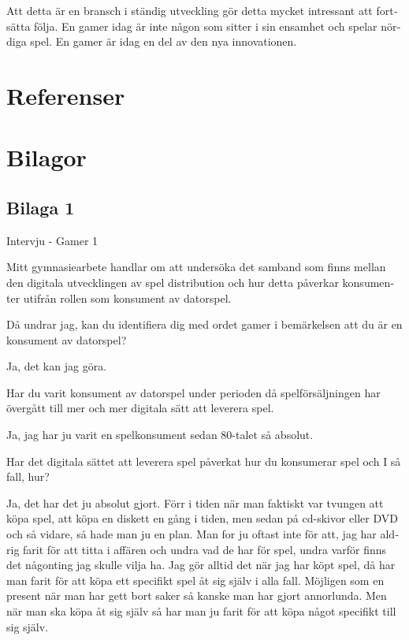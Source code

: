 \documentclass[11p]{article}
\begin{document}
\begin{otherlanguage}{swedish}
        Att detta är en bransch i ständig utveckling gör detta mycket intressant att fortsätta följa. En gamer idag är inte någon som sitter i sin ensamhet och spelar nördiga spel. En gamer är idag en del av den nya innovationen.


    \setlength{\leftskip}{0cm}

        \newpage
        \section{Referenser}
        \printbibliography[heading=none]

        \newpage
        \section{Bilagor}

        \subsection{Bilaga 1}
        Intervju - Gamer 1

        Mitt gymnasiearbete handlar om att undersöka det samband som finns mellan den digitala utvecklingen av spel distribution och hur detta påverkar konsumenter utifrån rollen som konsument av datorspel.

        Då undrar jag, kan du identifiera dig med ordet gamer i bemärkelsen att du är en konsument av datorspel?


        \setlength{\leftskip}{1cm}

        Ja, det kan jag göra.

        \setlength{\leftskip}{0cm}
        Har du varit konsument av datorspel under perioden då spelförsäljningen har övergått till mer och mer digitala sätt att leverera spel.


        \setlength{\leftskip}{1cm}

        Ja, jag har ju varit en spelkonsument sedan 80-talet så absolut.

        \setlength{\leftskip}{0cm}
        Har det digitala sättet att leverera spel påverkat hur du konsumerar spel och I så fall, hur?


        \setlength{\leftskip}{1cm}

        Ja, det har det ju absolut gjort.
        Förr i tiden när man faktiskt var tvungen att köpa spel, att köpa en diskett en gång i tiden, men sedan på cd-skivor eller DVD och så vidare, så hade man ju en plan.
        Man for ju oftast inte för att, jag har aldrig farit för att titta i affären och undra vad de har för spel, undra varför finns det någonting jag skulle vilja ha. Jag gör alltid det när jag har köpt spel, då har man farit för att köpa ett specifikt spel åt sig själv i alla fall. Möjligen som en present när man har gett bort saker så kanske man har gjort annorlunda.
        Men när man ska köpa åt sig själv så har man ju farit för att köpa något specifikt till sig själv.


\end{otherlanguage}
\end{document}
